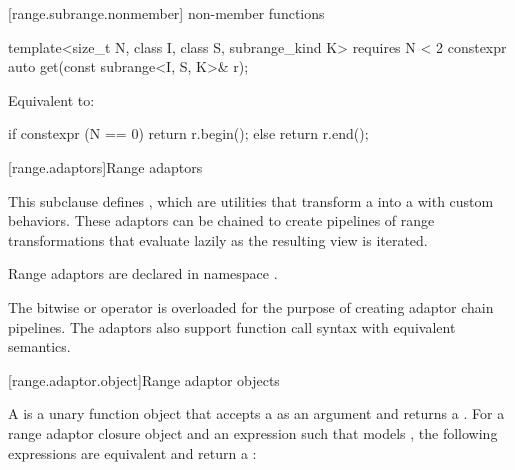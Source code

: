 \begin{addedblock}
[range.subrange.nonmember]{ non-member functions}

%
\begin{itemdecl}
template<size_t N, class I, class S, subrange_kind K>
  requires N < 2
constexpr auto get(const subrange<I, S, K>& r);
\end{itemdecl}

\begin{itemdescr}
\pnum
\effects Equivalent to:
\begin{codeblock}
if constexpr (N == 0)
  return r.begin();
else
  return r.end();
\end{codeblock}
\end{itemdescr}

[range.adaptors]{Range adaptors}

\pnum
This subclause defines , which are utilities that transform a
 into a  with custom behaviors. These
adaptors can be chained to create pipelines of range transformations that
evaluate lazily as the resulting view is iterated.

\pnum
Range adaptors are declared in namespace .

\pnum
The bitwise or operator is overloaded for the purpose of creating adaptor chain
pipelines. The adaptors also support function call syntax with equivalent
semantics.

\pnum
\begin{example}
\end{example}

[range.adaptor.object]{Range adaptor objects}

\pnum
A  is a unary function object that accepts
a  as an argument and returns a . For
a range adaptor closure object  and an expression  such that
 models , the following
expressions are equivalent and return a :


\end{addedblock}
